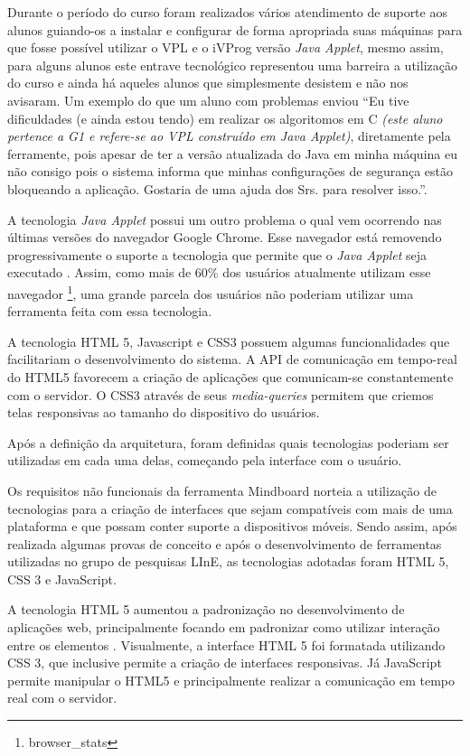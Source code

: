 Durante o período do curso foram realizados vários atendimento de suporte aos alunos guiando-os a instalar e configurar de forma apropriada suas máquinas para que fosse possível utilizar o VPL e o iVProg versão \emph{Java Applet}, mesmo assim, para alguns alunos este entrave tecnológico representou uma barreira a utilização do curso e ainda há aqueles alunos que simplesmente desistem e não nos avisaram. Um exemplo do que um aluno com problemas enviou ``Eu tive dificuldades (e ainda estou tendo) em realizar os algoritomos em C \emph{(este aluno pertence a G1 e refere-se ao VPL construído em Java Applet)}, diretamente pela ferramente, pois apesar de ter a versão atualizada do Java em minha máquina eu não consigo pois o sistema informa que minhas configurações de segurança estão bloqueando a aplicação. Gostaria de uma ajuda dos Srs. para resolver isso.''. 

A tecnologia \emph{Java Applet} possui um outro problema o qual vem ocorrendo nas últimas versões do navegador Google Chrome. Esse navegador está removendo progressivamente o suporte a tecnologia que permite que o \emph{Java Applet} seja executado \cite{java_chrome}. Assim, como mais de 60\% dos usuários atualmente utilizam esse navegador \footnote{browser_stats}, uma grande parcela dos usuários não poderiam utilizar uma ferramenta feita com essa tecnologia.

A tecnologia HTML 5, Javascript e CSS3 possuem algumas funcionalidades que facilitariam o desenvolvimento do sistema. A API de comunicação em tempo-real do HTML5 favorecem a criação de aplicações que comunicam-se constantemente com o servidor. O CSS3 através de seus \emph{media-queries} permitem que criemos telas responsivas ao tamanho do dispositivo do usuários.

Após a definição da arquitetura, foram definidas quais tecnologias poderiam ser utilizadas em cada uma delas, começando pela interface com o usuário. 


Os requisitos não funcionais da ferramenta Mindboard norteia a utilização de tecnologias para a criação de interfaces que sejam compatíveis com mais de uma plataforma e que possam conter suporte a dispositivos móveis. Sendo assim, após realizada algumas provas de conceito e após o desenvolvimento de ferramentas utilizadas no grupo de pesquisas LInE, as tecnologias adotadas foram HTML 5, CSS 3 e JavaScript.

A tecnologia HTML 5 aumentou a padronização no desenvolvimento de aplicações web, principalmente focando em padronizar como utilizar interação entre os elementos \cite{html5}. Visualmente, a interface HTML 5 foi formatada utilizando CSS 3, que inclusive permite a criação de interfaces responsivas. Já JavaScript permite manipular o HTML5 e principalmente realizar a comunicação em tempo real com o servidor.

